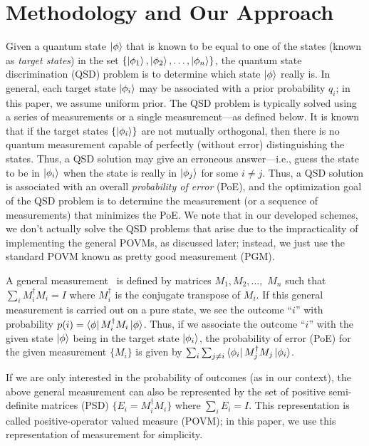 \section{Methodology and Our Approach}
\label{sec:povm}


Given a quantum state $\ket{\phi}$ that is known to be equal to one of the 
states (known as \emph{target states}) in the set 
$\{\ket{\phi_1}, \ket{\phi_2}, \ldots, \ket{\phi_n} \}$,
the quantum state discrimination (QSD) problem 
is to determine which state $\ket{\phi}$ really is.
In general, each target state $\ket{\phi_i}$ may be associated with
a prior probability $q_i$; in this paper, we assume uniform
prior.
The QSD problem is typically solved using a series of measurements or 
a single measurement---as defined below.
It is known that if the target states $\{\ket{\phi_i}\}$  are not mutually orthogonal, 
then there is no quantum measurement capable of perfectly (without error)
distinguishing the states.
Thus, a QSD solution may give an erroneous answer---i.e., guess the
state to be in $\ket{\phi_i}$ when the state is really in $\ket{\phi_j}$ for 
some $i \neq j$. Thus, a QSD solution is associated with an overall {\em probability
of error} (PoE), and the optimization goal of the QSD problem is to determine the
measurement (or a sequence of measurements) that minimizes the PoE. 
We note that in our developed schemes, we don't actually solve the QSD 
problems that arise due to the impracticality of implementing the general POVMs, as discussed
later; instead, we just use the standard POVM known as pretty good measurement (PGM).

A general measurement~\cite{qcqi-book} is defined by matrices $M_1, M_2, \ldots,$ $M_n$ such that
$\sum_i M_i^{\dagger}M_i = I$ where $M_i^{\dagger}$ is the conjugate transpose of
$M_i$. If this general measurement is carried out on a pure state,
we see the outcome ``$i$'' with 
probability $p(i) = \bra{\phi}M_i^{\dagger}M_i\ket{\phi}$. Thus, if we associate
the outcome ``$i$'' with the given state $\ket{\phi}$ being in the target state 
$\ket{\phi_i}$, the probability of error (PoE) for the given measurement $\{M_i\}$
is given by $\sum_i \sum_{j \neq i} \bra{\phi_i}M_j^{\dagger}M_j\ket{\phi_i}$.

If we are only interested in the probability of outcomes (as in our context), the above
general measurement can also be represented by the set of positive semi-definite 
matrices (PSD) $\{E_i = M_i^{\dagger}M_i\}$ where $\sum_{i} E_i = I$. This representation 
is called positive-operator valued measure (POVM); in this paper, we use this 
representation of measurement for simplicity. 

